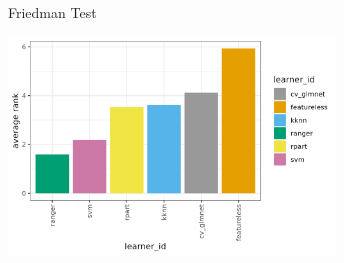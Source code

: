 \documentclass[11pt,compress,t,notes=noshow, aspectratio=169, xcolor=table]{beamer}
\begin{document}
\begin{frame}{Friedman Test}

{
    \tiny
    
}
    \centering
    \includegraphics[width = 0.65\textwidth]{figure/benchmarkrankplot.png}

\end{frame}





\end{document}
